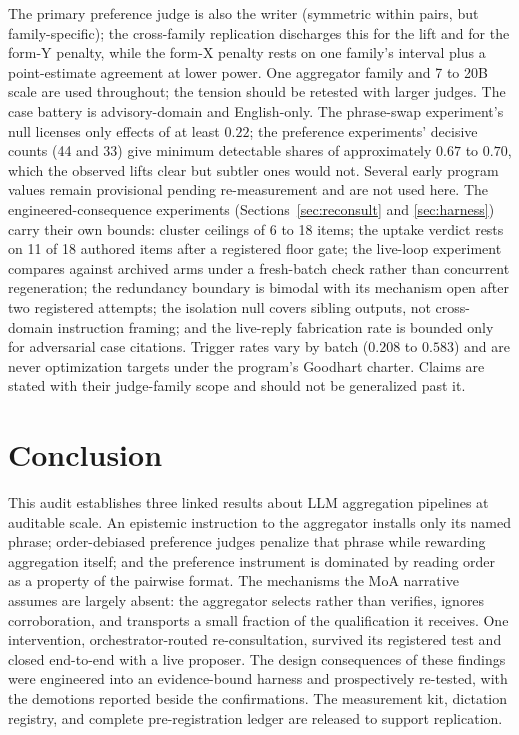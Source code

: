 \documentclass[11pt]{article}
\begin{document}
The primary preference judge is also the writer (symmetric within
pairs, but family-specific); the cross-family replication discharges
this for the lift and for the form-Y penalty, while the form-X penalty
rests on one family's interval plus a point-estimate agreement at lower
power. One aggregator family and 7 to 20B scale are used throughout;
the tension should be retested with larger judges. The case battery is
advisory-domain and English-only. The phrase-swap experiment's null
licenses only effects of at least $0.22$; the preference experiments'
decisive counts (44 and 33) give minimum detectable shares of
approximately $0.67$ to $0.70$, which the observed lifts clear but
subtler ones would not. Several early program values remain provisional
pending re-measurement and are not used here. The engineered-consequence
experiments (Sections~\ref{sec:reconsult} and \ref{sec:harness}) carry
their own bounds: cluster ceilings of 6 to 18 items; the uptake verdict
rests on 11 of 18 authored items after a registered floor gate; the
live-loop experiment compares against archived arms under a fresh-batch
check rather than concurrent regeneration; the redundancy boundary is
bimodal with its mechanism open after two registered attempts; the
isolation null covers sibling outputs, not cross-domain instruction
framing; and the live-reply fabrication rate is bounded only for
adversarial case citations. Trigger rates vary by batch ($0.208$ to
$0.583$) and are never optimization targets under the program's
Goodhart charter. Claims are stated with their judge-family scope and
should not be generalized past it.

\section{Conclusion}
\label{sec:conclusion}

This audit establishes three linked results about LLM aggregation
pipelines at auditable scale. An epistemic instruction to the
aggregator installs only its named phrase; order-debiased preference
judges penalize that phrase while rewarding aggregation itself; and the
preference instrument is dominated by reading order as a property of
the pairwise format. The mechanisms the MoA narrative assumes are
largely absent: the aggregator selects rather than verifies, ignores
corroboration, and transports a small fraction of the qualification it
receives. One intervention, orchestrator-routed re-consultation,
survived its registered test and closed end-to-end with a live
proposer. The design consequences of these findings were engineered
into an evidence-bound harness and prospectively re-tested, with the
demotions reported beside the confirmations. The measurement kit,
dictation registry, and complete pre-registration ledger are released
to support replication.
\end{document}
